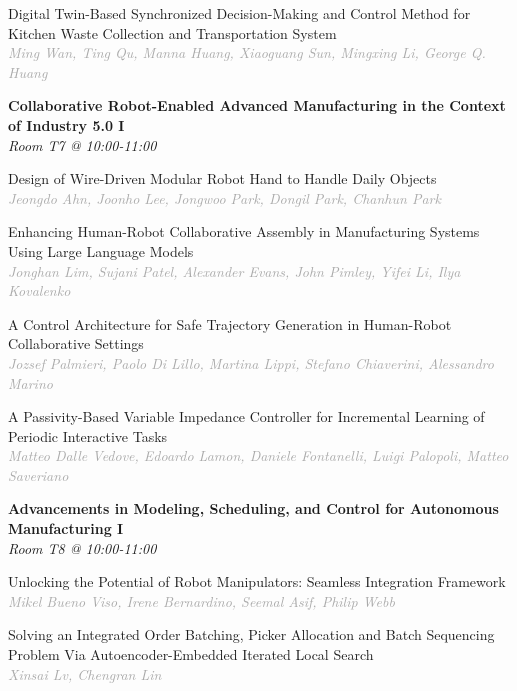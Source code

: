 \begin{multicols*}{2}
\small Digital Twin-Based Synchronized Decision-Making and Control Method for Kitchen Waste Collection and Transportation System\\ 
\footnotesize \textcolor{darkgray}{\textit{Ming Wan, Ting  Qu, Manna  Huang, Xiaoguang  Sun, Mingxing  Li, George Q.  Huang}}

\normalsize \textbf{Collaborative Robot-Enabled Advanced Manufacturing in the Context of Industry 5.0 I}\\
\small \textit{Room T7 @ 10:00-11:00}

\small Design of Wire-Driven Modular Robot Hand to Handle Daily Objects\\ 
\footnotesize \textcolor{darkgray}{\textit{Jeongdo Ahn, Joonho  Lee, Jongwoo  Park, Dongil  Park, Chanhun  Park}}

\small Enhancing Human-Robot Collaborative Assembly in Manufacturing Systems Using Large Language Models\\ 
\footnotesize \textcolor{darkgray}{\textit{Jonghan Lim, Sujani  Patel, Alexander  Evans, John  Pimley, Yifei  Li, Ilya  Kovalenko}}

\small A Control Architecture for Safe Trajectory Generation in Human-Robot Collaborative Settings\\ 
\footnotesize \textcolor{darkgray}{\textit{Jozsef Palmieri, Paolo  Di Lillo, Martina  Lippi, Stefano  Chiaverini, Alessandro  Marino}}

\small A Passivity-Based Variable Impedance Controller for Incremental Learning of Periodic Interactive Tasks\\ 
\footnotesize \textcolor{darkgray}{\textit{Matteo Dalle Vedove, Edoardo  Lamon, Daniele  Fontanelli, Luigi  Palopoli, Matteo  Saveriano}}

\normalsize \textbf{Advancements in Modeling, Scheduling, and Control for Autonomous Manufacturing I}\\
\small \textit{Room T8 @ 10:00-11:00}

\small Unlocking the Potential of Robot Manipulators: Seamless Integration Framework\\ 
\footnotesize \textcolor{darkgray}{\textit{Mikel Bueno Viso, Irene  Bernardino, Seemal  Asif, Philip  Webb}}

\small Solving an Integrated Order Batching, Picker Allocation and Batch Sequencing Problem Via Autoencoder-Embedded Iterated Local Search\\ 
\footnotesize \textcolor{darkgray}{\textit{Xinsai Lv, Chengran  Lin}}


\end{multicols*}
